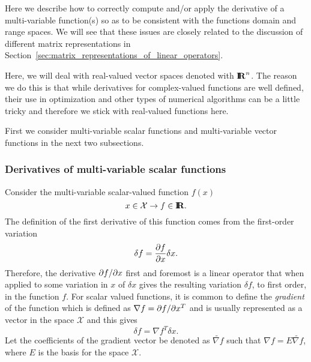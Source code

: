 Here we describe how to correctly compute and/or apply the derivative of a
multi-variable function(s) so as to be consistent with the functions domain
and range spaces.  We will see that these issues are closely related to the
discussion of different matrix representations in
Section~\ref{sec:matrix_representations_of_linear_operators}.

Here, we will deal with real-valued vector spaces denoted with $\mbox{\textbf{I}}\hspace{-0.6ex}\mbox{\textbf{R}}^n$.  The
reason we do this is that while derivatives for complex-valued functions are
well defined, their use in optimization and other types of numerical
algorithms can be a little tricky and therefore we stick with real-valued
functions here.

First we consider multi-variable scalar functions and multi-variable vector
functions in the next two subsections.

\subsubsection{Derivatives of multi-variable scalar functions}
\label{sec:scalar_function_derivatives}
 
Consider the multi-variable scalar-valued function $f(x)$
\[
x\in\mathcal{X} \rightarrow f\in\mbox{\textbf{I}}\hspace{-0.6ex}\mbox{\textbf{R}}.
\]
The definition of the first derivative of this function comes from the
first-order variation
\[
\delta f = \displaystyle{\frac{\partial f}{\partial x}} \delta x.
\]
Therefore, the derivative $\partial f / \partial x$ first and foremost is a linear operator
that when applied to some variation in $x$ of $\delta x$ gives the resulting
variation $\delta f$, to first order, in the function $f$.  For scalar valued
functions, it is common to define the {}\textit{gradient} of the function
which is defined as $\nabla f = \partial f / \partial x^T$ and is usually represented as a
vector in the space $\mathcal{X}$ and this gives
\[
\delta f = {\nabla f}^T \delta x.
\]
Let the coefficients of the gradient vector be denoted as $\tilde{\nabla f}$
such that $\nabla f = E {}\tilde{\nabla f}$, where $E$ is the basis for the
space $\mathcal{X}$.

